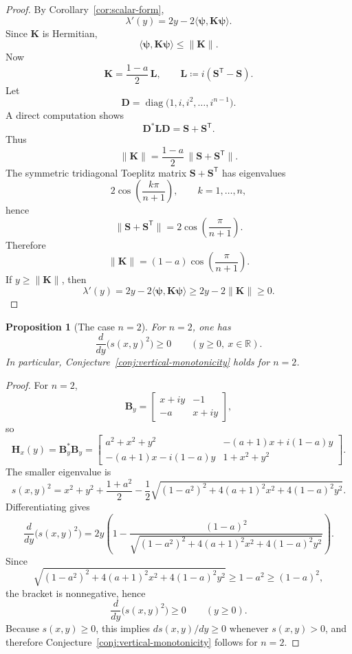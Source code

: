 \documentclass[11pt]{article}
\newtheorem{proposition}[theorem]{Proposition}
\begin{document}
\begin{proof}
By Corollary~\ref{cor:scalar-form},
\[
\lambda'(y)=2y-2\langle \boldsymbol{\psi},\mathbf K\boldsymbol{\psi}\rangle.
\]
Since \(\mathbf K\) is Hermitian,
\[
\langle \boldsymbol{\psi},\mathbf K\boldsymbol{\psi}\rangle\le \|\mathbf K\|.
\]
Now
\[
\mathbf K=\frac{1-a}{2}\,\mathbf L,
\qquad
\mathbf L\coloneqq i(\mathbf S^{\mathsf T}-\mathbf S).
\]
Let
\[
\mathbf D=\operatorname{diag}\bigl(1,i,i^2,\dots,i^{n-1}\bigr).
\]
A direct computation shows
\[
\mathbf D^*\mathbf L\mathbf D=\mathbf S+\mathbf S^{\mathsf T}.
\]
Thus
\[
\|\mathbf K\|
=
\frac{1-a}{2}\,\|\mathbf S+\mathbf S^{\mathsf T}\|.
\]
The symmetric tridiagonal Toeplitz matrix \(\mathbf S+\mathbf S^{\mathsf T}\) has eigenvalues
\[
2\cos\!\left(\frac{k\pi}{n+1}\right),\qquad k=1,\dots,n,
\]
hence
\[
\|\mathbf S+\mathbf S^{\mathsf T}\|=2\cos\!\left(\frac{\pi}{n+1}\right).
\]
Therefore
\[
\|\mathbf K\|
=
(1-a)\cos\!\left(\frac{\pi}{n+1}\right).
\]
If \(y\ge \|\mathbf K\|\), then
\[
\lambda'(y)=2y-2\langle \boldsymbol{\psi},\mathbf K\boldsymbol{\psi}\rangle\ge 2y-2\|\mathbf K\|\ge 0.
\]
\end{proof}

\begin{proposition}[The case \(n=2\)]\label{prop:n=2}
For \(n=2\), one has
\[
\frac{d}{dy}\bigl(s(x,y)^2\bigr)\ge 0
\qquad (y\ge 0,\ x\in\mathbb R).
\]
In particular, Conjecture~\ref{conj:vertical-monotonicity} holds for \(n=2\).
\end{proposition}

\begin{proof}
For \(n=2\),
\[
\mathbf B_y=
\begin{bmatrix}
x+iy & -1\\
-a & x+iy
\end{bmatrix},
\]
so
\[
\mathbf H_x(y)=\mathbf B_y^*\mathbf B_y=
\begin{bmatrix}
a^2+x^2+y^2 & -(a+1)x+i(1-a)y\\
-(a+1)x-i(1-a)y & 1+x^2+y^2
\end{bmatrix}.
\]
The smaller eigenvalue is
\[
s(x,y)^2
=
x^2+y^2+\frac{1+a^2}{2}
-\frac12\sqrt{(1-a^2)^2+4(a+1)^2x^2+4(1-a)^2y^2}.
\]
Differentiating gives
\[
\frac{d}{dy}\bigl(s(x,y)^2\bigr)
=
2y\left(
1-\frac{(1-a)^2}{
\sqrt{(1-a^2)^2+4(a+1)^2x^2+4(1-a)^2y^2}}
\right).
\]
Since
\[
\sqrt{(1-a^2)^2+4(a+1)^2x^2+4(1-a)^2y^2}\ge 1-a^2\ge (1-a)^2,
\]
the bracket is nonnegative, hence
\[
\frac{d}{dy}\bigl(s(x,y)^2\bigr)\ge 0
\qquad (y\ge 0).
\]
Because \(s(x,y)\ge 0\), this implies \(d s(x,y)/dy\ge 0\) whenever \(s(x,y)>0\), and therefore Conjecture~\ref{conj:vertical-monotonicity} follows for \(n=2\).
\end{proof}
\end{document}
